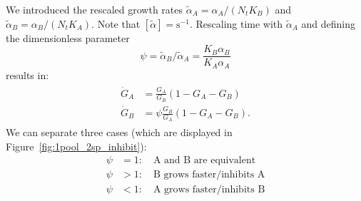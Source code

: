 \documentclass[10pt,A4paper]{article}
\numberwithin{equation}{section}
\begin{document}
We introduced the rescaled growth rates $\tilde{\alpha}_A=\alpha_A/(N_tK_B)$ and $\tilde{\alpha}_B=\alpha_B/(N_tK_A)$. Note that $[\tilde{\alpha}]=\mathrm{s}^{-1}$.
Rescaling time with $\tilde{\alpha}_A$ and defining the dimensionless parameter
\begin{equation}
    \psi = \tilde{\alpha}_B/\tilde{\alpha}_A = \frac{K_B\alpha_B}{K_A\alpha_A}
\end{equation}
results in: 
\begin{align}
    \begin{split}
        \dot{G}_A &=\frac{G_A}{G_B}\left(1 - G_A-G_B\right)\\
        \dot{G}_B &=\psi\frac{G_B}{G_A}\left(1-G_A-G_B\right). 
    \end{split}
\label{eq:2sp_1pool_inhibit_unitless}
\end{align}
We can separate three cases (which are displayed in Figure~\ref{fig:1pool_2sp_inhibit}):
\begin{align}
    \psi&=1:\quad\text{A and B are equivalent}\\
    \psi&>1:\quad\text{B grows faster/inhibits A}\\
    \psi&<1:\quad\text{A grows faster/inhibits B}
\end{align}
%
\end{document}
